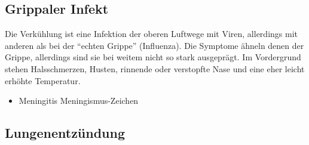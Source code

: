 % 
% 

\subsection{Grippaler Infekt}



{%
Die Verkühlung ist eine Infektion der oberen Luftwege mit
Viren, allerdings mit anderen als bei der \enquote{echten Grippe}
(Influenza). Die Symptome ähneln denen der Grippe,
allerdings sind sie bei weitem nicht so stark ausgeprägt. Im
Vordergrund stehen Halsschmerzen, Husten, rinnende oder
verstopfte Nase und eine eher leicht erhöhte Temperatur.
}{}{}{}{}

{
\begin{itemize}
  \item Meningitis  Meningismus-Zeichen
\end{itemize}
}{}{}{}


\subsection{Lungenentzündung}
\label{topic:pneumonie}
\label{topic:lungenentzuendung}

